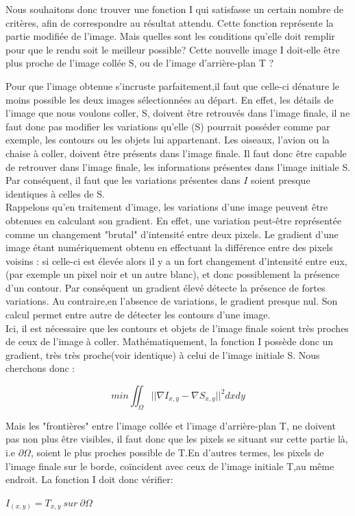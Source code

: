 Nous souhaitons donc trouver une fonction I qui satisfasse un certain nombre de critères, afin de correspondre au résultat attendu.  
Cette fonction représente la partie modifiée de l'image. Mais quelles sont les conditions qu'elle doit remplir pour que le rendu soit le meilleur possible? Cette nouvelle image I doit-elle être plus proche de l'image collée S, ou de l'image d'arrière-plan T ? \newline

Pour que l'image obtenue s'incruste parfaitement,il faut que celle-ci dénature le moins possible les deux images sélectionnées au départ. En effet, les détails de l'image que nous voulons coller, S, doivent être retrouvés dans l'image finale, il ne faut donc pas modifier les variations qu'elle (S) pourrait posséder comme par exemple, les contours ou les objets lui appartenant. Les oiseaux, l'avion ou la chaise à coller, doivent être présents dans l'image finale. Il faut donc être capable de retrouver dans l'image finale, les informations présentes dans l'image initiale S. Par conséquent, il faut que les variations présentes dans $I$ soient presque identiques à celles de S.\\
Rappelons qu'en traitement d'image, les variations d'une image peuvent être obtenues en calculant son gradient. En effet, une variation peut-être représentée comme un changement "brutal" d'intensité entre deux pixels. Le gradient d'une image étant numériquement obtenu en effectuant la différence entre des pixels voisins : si celle-ci est élevée alors il y a un fort changement d'intensité entre eux, (par exemple un pixel noir et un autre blanc), et donc possiblement la présence d'un contour. Par conséquent un gradient élevé détecte la présence de fortes variations. Au contraire,en l'absence de variations, le gradient presque nul. Son calcul permet entre autre de détecter les contours d'une image.\\
Ici, il est nécessaire que les contours et objets de l'image finale soient très proches de ceux de l'image à coller. Mathématiquement, la fonction I possède donc un gradient, très très proche(voir identique) à celui de l'image initiale S. Nous cherchons donc :
\begin{center}
    $$ min \iint_\Omega || \nabla I_{x,y} - \nabla S_{x,y}||^2 dxdy$$
\end{center} 

Mais les "frontières" entre l'image collée et l'image d'arrière-plan T, ne doivent pas non plus être visibles, il faut donc que les pixels se situant sur cette partie là, i.e $\partial \Omega$, soient le plus proches possible de T.En d'autres termes, les pixels de l'image finale sur le borde, coïncident avec ceux de l'image initiale T,au même endroit. La fonction I doit donc vérifier: 
\begin{center}
    $I_{(x,y)} = T_{x,y} \ sur\ \partial \Omega$
\end{center}

